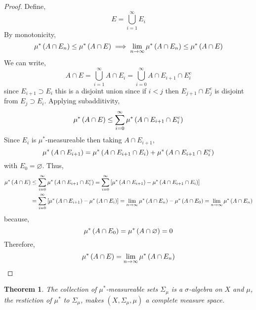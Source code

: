 \documentclass{article}
\theoremstyle{theorem}
\newtheorem{theorem}{Theorem}[section]
\theoremstyle{definition}
\theoremstyle{definition}
\theoremstyle{remark}
\theoremstyle{definition}
\theoremstyle{remark}
\begin{document}
\begin{proof}
Define,
\[ E = \bigcup_{i = 1}^\infty E_i \]
By monotonicity, 
\[ \mu^*\left( A \cap E_n \right) \le \mu^*\left( A \cap E \right) \implies \lim_{n \to \infty} \mu^*\left( A \cap E_n \right) \le \mu^*\left( A \cap E \right) \]
We can write,
\[ A \cap E = \bigcup_{i = 1}^\infty A \cap E_i = \bigcup_{i = 0}^\infty A \cap E_{i+1} \cap E_i^c \]
since $E_{i+1} \supset E_i$ this is a disjoint union since if $i < j$ then $E_{j+1} \cap E_{j}^c$ is disjoint from $E_j \supset E_i$. Applying subadditivity,
\begin{align*}
\mu^*\left( A \cap E \right)  \le \sum_{i = 0}^\infty \mu^*\left( A \cap E_{i + 1} \cap E_i^c \right)
\end{align*}
Since $E_i$ is $\mu^*$-measureable then taking $A \cap E_{i+1}$, 
\[ \mu^*\left( A \cap E_{i+1} \right) = \mu^*\left( A \cap E_{i+1} \cap E_i \right) + \mu^*\left( A \cap E_{i+1} \cap E_i^c \right) \]
with $E_0 = \varnothing$. Thus,
\begin{align*}
\mu^*\left( A \cap E \right) & \le \sum_{i = 0}^\infty \mu^*\left( A \cap E_{i + 1} \cap E_i^c \right) = \sum_{i = 0}^\infty \left[  \mu^*\left( A \cap E_{i+1} \right) - \mu^*\left( A \cap E_{i+1} \cap E_i \right) \right] 
\\
& = \sum_{i = 0}^\infty \left[  \mu^*\left( A \cap E_{i+1} \right) - \mu^*\left( A \cap E_i \right) \right] = \lim_{n \to \infty} \mu^*\left( A \cap E_{n} \right) - \mu^*\left( A \cap E_0 \right) = \lim_{n \to \infty} \mu^*\left( A \cap E_{n} \right)
\end{align*}
because,
\[ \mu^*\left( A \cap E_0 \right) = \mu^*\left( A \cap \varnothing \right) = 0\]
Therefore,
\[ \mu^*\left( A \cap E \right) = \lim_{n \to \infty} \mu^*\left( A \cap E_{n} \right) \]
\end{proof}

\begin{theorem}
The collection of $\mu^*$-measureable sets $\Sigma_{\mu}$ is a $\sigma$-algebra on $X$ and $\mu$, the restiction of $\mu^*$ to $\Sigma_\mu$, makes $(X, \Sigma_\mu, \mu)$ a complete measure space. 
\end{theorem}
\end{document}
